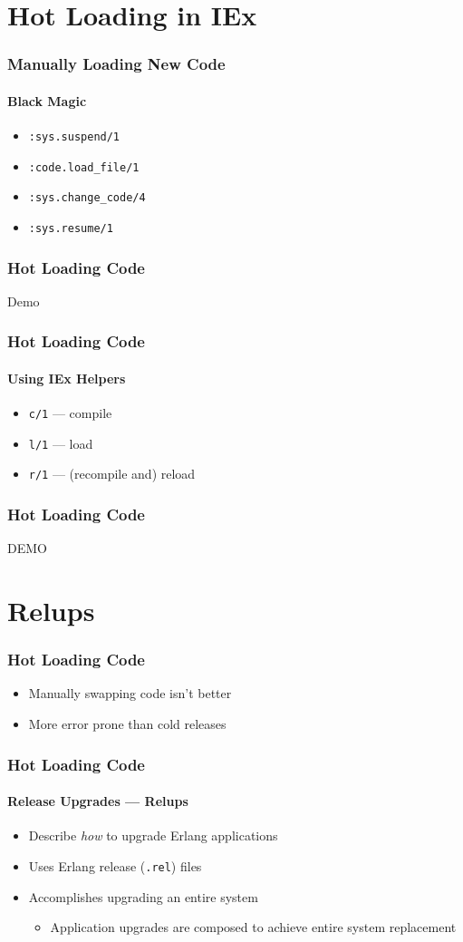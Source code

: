 \documentclass{beamer}
\begin{document}
\section{Hot Loading in IEx}

\begin{frame}
\frametitle{Manually Loading New Code}
\framesubtitle{Black Magic}
\begin{itemize}
\item{\texttt{:sys.suspend/1}}
\item{\texttt{:code.load\_file/1}}
\item{\texttt{:sys.change\_code/4}}
\item{\texttt{:sys.resume/1}}
\end{itemize}
\end{frame}

\begin{frame}
\frametitle{Hot Loading Code}
\Huge{Demo}
\end{frame}

\begin{frame}
\frametitle{Hot Loading Code}
\framesubtitle{Using IEx Helpers}
\begin{itemize}
\item{\texttt{c/1} --- compile}
\item{\texttt{l/1} --- load}
\item{\texttt{r/1} --- (recompile and) reload}
\end{itemize}
\end{frame}

\begin{frame}
\frametitle{Hot Loading Code}
\Huge{DEMO}
\end{frame}

\section{Relups}

\begin{frame}
\frametitle{Hot Loading Code}
\begin{itemize}
\item{Manually swapping code isn't better}
\item{More error prone than cold releases}
\end{itemize}
\end{frame}

\begin{frame}
\frametitle{Hot Loading Code}
\framesubtitle{Release Upgrades --- Relups}
\begin{itemize}
\item{Describe \textit{how} to upgrade Erlang applications}
\item{Uses Erlang release (\texttt{.rel}) files}
\item{Accomplishes upgrading an entire system}
\begin{itemize}
\item{Application upgrades are composed to achieve entire system replacement}
\end{itemize}
\end{itemize}
\end{frame}
\end{document}
